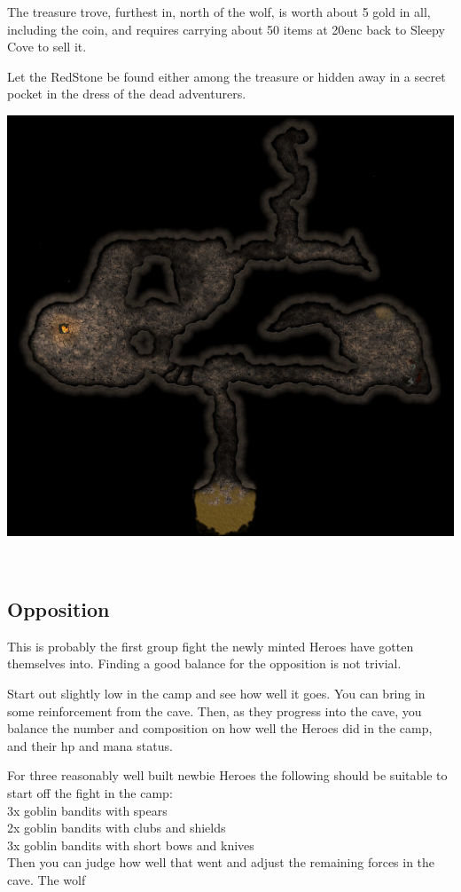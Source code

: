 The treasure trove, furthest in, north of the wolf, is worth about 5 gold in all, including the coin, and requires carrying about 50 items at 20enc back to Sleepy Cove to sell it.

Let the RedStone be found either among the treasure or hidden away in a secret pocket in the dress of the dead adventurers.

\begin{center}
\includegraphics[width=1.0\linewidth]{./maps/goblin-cave-(32+0+0).jpg}
\end{center}

\



\subsection*{Opposition}
This is probably the first group fight the newly minted Heroes have gotten themselves into. Finding a good balance for the opposition is not trivial.

Start out slightly low in the camp and see how well it goes. You can bring in some reinforcement from the cave.
Then, as they progress into the cave, you balance the number and composition on how well the Heroes did in the camp, and their hp and mana status.

For three reasonably well built newbie Heroes the following should be suitable to start off the fight in the camp:\\
3x goblin bandits with spears\\
2x goblin bandits with clubs and shields\\
3x goblin bandits with short bows and knives\\
Then you can judge how well that went and adjust the remaining forces in the cave. The wolf

